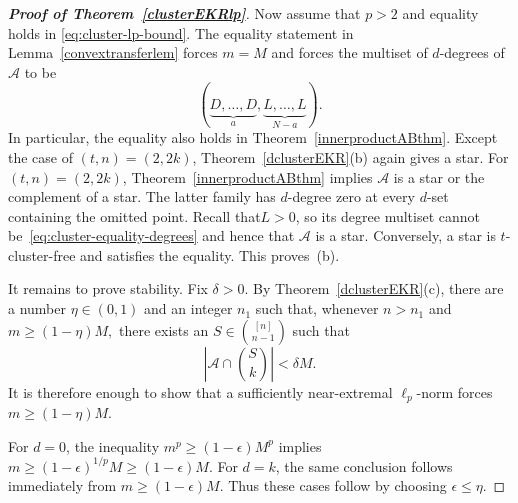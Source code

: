 \documentclass[11pt]{article}
\numberwithin{equation}{section}
\def\A{\mathcal{A}}
\begin{document}
\begin{proof}[{\bf Proof of Theorem~\ref{clusterEKRlp}}]
	Now assume that $p>2$ and equality holds in
	\eqref{eq:cluster-lp-bound}.
The equality statement in Lemma~\ref{convextransferlem} forces $m=M$ and forces the multiset of $d$-degrees of $\A$ to be
	\begin{equation}\label{eq:cluster-equality-degrees}
		(\underbrace{D,\ldots,D}_{a},
		\underbrace{L,\ldots,L}_{N-a}).
	\end{equation}
In particular, the equality also holds in Theorem~\ref{innerproductABthm}.
Except the case of $(t,n)=(2,2k)$, Theorem~\ref{dclusterEKR}(b) again gives a star.
For $(t,n)=(2,2k)$,
Theorem~\ref{innerproductABthm} implies $\A$ is a star or the complement of a star.
The latter family has $d$-degree zero at every $d$-set containing the omitted point.
Recall that$L>0$,  so its degree multiset cannot be~\eqref{eq:cluster-equality-degrees} and hence that $\A$ is a star.
Conversely, a star is $t$-cluster-free and satisfies the equality.
This proves~(b).

	
It remains to prove stability.
Fix $\delta>0$.
By Theorem~\ref{dclusterEKR}(c), there are a number $\eta\in(0,1)$ and an integer $n_1$ such that, whenever $n>n_1$ and $m\geq(1-\eta)M,$
	there exists an $S\in\binom{[n]}{n-1}$ such that
	\[
	\left|\A\cap\binom Sk\right|<\delta M.
	\]
	It is therefore enough to show that a sufficiently near-extremal
	$\ell_p$-norm forces $m\geq(1-\eta)M$.
	
For $d=0$, the inequality $m^p\geq(1-\epsilon)M^p$ implies
$m\geq(1-\epsilon)^{1/p}M\geq(1-\epsilon)M$.
For $d=k$, the same conclusion follows immediately from
$m\geq(1-\epsilon)M$.
Thus these cases follow by choosing $\epsilon\leq\eta$.
	

\end{proof}
\end{document}
